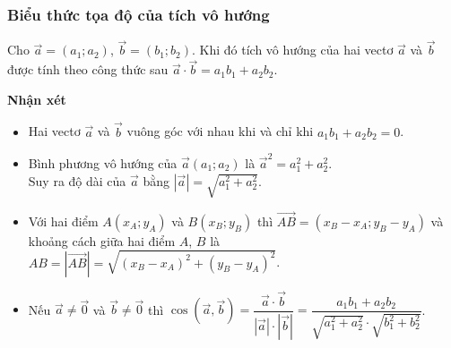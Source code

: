 \subsubsection{Biểu thức tọa độ của tích vô hướng}
\begin{dn}{}
	Cho $\overrightarrow{a} = (a_1; a_2)$, $\overrightarrow{b} = (b_1; b_2)$. Khi đó tích vô hướng của hai vectơ $\overrightarrow{a}$ và $\overrightarrow{b}$ được tính theo công thức sau $\overrightarrow{a} \cdot \overrightarrow{b} = a_1b_1 + a_2b_2$.
\end{dn}
\textbf{Nhận xét}
\begin{itemize}
	\item Hai vectơ $\overrightarrow{a}$ và $\overrightarrow{b}$ vuông góc với nhau khi và chỉ khi $a_1b_1 + a_2b_2 = 0$.
	\item Bình phương vô hướng của $\overrightarrow{a}(a_1;a_2)$ là $\overrightarrow{a}^2 = a_1^2 + a_2^2$. \\
	      Suy ra độ dài của $\vec{a}$ bằng $|\vec{a}|=\sqrt{a_1^2+a_2^2}$.
	\item Với hai điểm $A(x_A;y_A)$ và $B(x_B;y_B)$ thì $\overrightarrow{AB}=(x_B-x_A;y_B-y_A)$ và khoảng cách giữa hai điểm $A$, $B$ là $AB=\left|\overrightarrow{AB}\right|=\sqrt{(x_B-x_A)^2+(y_B-y_A)^2}$.
	\item Nếu $\overrightarrow{a}\neq \overrightarrow{0}$ và $\overrightarrow{b}\neq \overrightarrow{0}$ thì $\cos \left(\overrightarrow{a},\overrightarrow{b}\right)= \dfrac{\overrightarrow{a}\cdot \overrightarrow{b} }{ |\overrightarrow{a}|\cdot |\overrightarrow{b}| } = \dfrac{a_1b_1 + a_2b_2}{\sqrt{a_1^2+a_2^2}\cdot \sqrt{b_1^2+b_2^2}}$.
\end{itemize}
